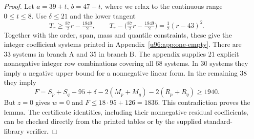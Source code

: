 \documentclass[11pt,a4paper]{article}
\theoremstyle{remark}
\begin{document}
\begin{proof}
Let $a=39+t$, $b=47-t$, where we relax to the continuous range $0\leq t\leq8$.
Use $\delta\leq21$ and the lower tangent
\[
 T_r\geq\tfrac{87}{2}r-\tfrac{1849}{2},
 \qquad T_r-\bigl(\tfrac{87}{2}r-\tfrac{1849}{2}\bigr)
 =\tfrac12(r-43)^2.
\]
Together with the order, span, mass and quantile constraints, these give
the integer coefficient systems printed in Appendix~\ref{u96:app:one-empty}.
There are 33 systems in branch A and 35 in branch B. The appendix supplies
21 explicit nonnegative integer row combinations covering all 68 systems.
In 30 systems they imply a negative upper bound for a nonnegative linear
form. In the remaining 38 they imply
\[
 F=S_p+S_q+95+\delta-2(M_p+M_q)-2(R_p+R_q)\geq1940.
\]
But $z=0$ gives $w=0$ and $F\leq18\cdot95+126=1836$.
This contradiction proves the lemma. The certificate identities, including
their nonnegative residual coefficients, can be checked directly from the
printed tables or by the supplied standard-library verifier.
\end{proof}
\end{document}
